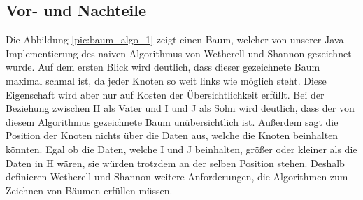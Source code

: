 \subsection{Vor- und Nachteile}
Die Abbildung \ref{pic:baum_algo_1} zeigt einen Baum, welcher von unserer Java-Implementierung des naiven Algorithmus von Wetherell und Shannon
gezeichnet wurde.
Auf dem ersten Blick wird deutlich, dass dieser gezeichnete Baum maximal schmal ist, da jeder Knoten so weit links wie möglich steht.
Diese Eigenschaft wird aber nur auf Kosten der Übersichtlichkeit erfüllt. Bei der Beziehung zwischen H als Vater und I und J als Sohn wird 
deutlich, dass der von diesem Algorithmus gezeichnete Baum unübersichtlich ist. Außerdem sagt die Position der Knoten nichts über die Daten 
aus, welche die Knoten beinhalten könnten. Egal ob die Daten, welche I und J beinhalten, größer oder kleiner als die Daten in H wären, 
sie würden trotzdem an der selben Position stehen. 
Deshalb definieren Wetherell und Shannon weitere Anforderungen, die Algorithmen zum Zeichnen von Bäumen erfüllen müssen.


